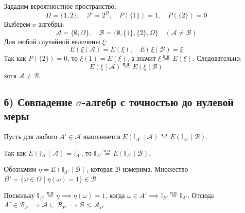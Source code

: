 \documentclass[12pt]{article}
\begin{document}
Зададим вероятностное пространство:
\[
\Omega = \{1, 2\}, \quad \mathcal{F} = 2^\Omega, \quad P(\{1\}) = 1, \quad P(\{2\}) = 0
\]
Выберем $\sigma$-алгебры:
\[
\mathcal{A} = \{\emptyset, \Omega\}, \quad \mathcal{B} = \{\emptyset, \{1\}, \{2\}, \Omega\} \quad (\mathcal{A} \neq \mathcal{B})
\]
Для любой случайной величины $\xi$:
\[
E(\xi \mid \mathcal{A}) = E(\xi), \quad E(\xi \mid \mathcal{B}) = \xi
\]
Так как $P(\{2\}) = 0$, то $\xi(1) = E(\xi)$, а значит $\xi \stackrel{\text{п.н.}}{=} E(\xi)$. Следовательно:
\[
E(\xi \mid \mathcal{A}) \stackrel{\text{п.н.}}{=} E(\xi \mid \mathcal{B})
\]
хотя $\mathcal{A} \neq \mathcal{B}$.

\subsection*{б) Совпадение $\sigma$-алгебр с точностью до нулевой меры}
Пусть для любого $A' \in \mathcal{A}$ выполняется $E(\mathbb{I}_{A'} \mid \mathcal{A}) \stackrel{\text{п.н.}}{=} E(\mathbb{I}_{A'} \mid \mathcal{B})$.

Так как $E(\mathbb{I}_{A'} \mid \mathcal{A}) = \mathbb{I}_{A'}$, то $\mathbb{I}_{A'} \stackrel{\text{п.н.}}{=} E(\mathbb{I}_{A'} \mid \mathcal{B})$.

Обозначим $\eta = E(\mathbb{I}_{A'} \mid \mathcal{B})$, которая $\mathcal{B}$-измерима. 
Множество $B' = \{\omega \in \Omega \mid \eta(\omega) = 1\} \in \mathcal{B}$.

Поскольку $\mathbb{I}_{A'} \stackrel{\text{п.н.}}{=} \eta \implies \eta(\omega) = 1$, когда $\omega \in A' \implies \mathbb{I}_{B'} \stackrel{\text{п.н.}}{=} \mathbb{I}_{A'}$.
Отсюда $A' \in \mathcal{B}_P \implies \mathcal{A} \subseteq \mathcal{B}_P \implies \mathcal{B} \le \mathcal{A}_P$.
\end{document}
